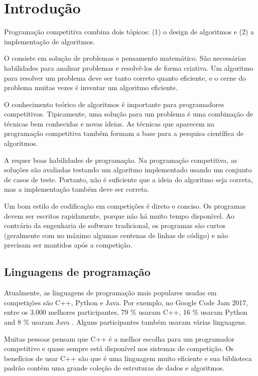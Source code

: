\chapter{Introdução}

Programação competitiva combina dois tópicos:
(1) o design de algoritmos e (2) a implementação de algoritmos.

O  consiste em solução de problemas
e pensamento matemático.
São necessárias habilidades para analisar problemas e resolvê-los de forma criativa.
Um algoritmo para resolver um problema deve ser tanto correto quanto eficiente, e o cerne do problema muitas vezes é inventar um algoritmo eficiente.

O conhecimento teórico de algoritmos é importante para programadores competitivos. Tipicamente, uma solução para um problema é uma combinação de técnicas bem conhecidas e novas ideias. As técnicas que aparecem na programação competitiva também formam a base para a pesquisa científica de algoritmos.

A  requer boas habilidades de programação. Na programação competitiva, as soluções são avaliadas testando um algoritmo implementado usando um conjunto de casos de teste. Portanto, não é suficiente que a ideia do algoritmo seja correta, mas a implementação também deve ser correta.

Um bom estilo de codificação em competições é direto e conciso. Os programas devem ser escritos rapidamente, porque não há muito tempo disponível. Ao contrário da engenharia de software tradicional, os programas são curtos (geralmente com no máximo algumas centenas de linhas de código) e não precisam ser mantidos após a competição.

\section{Linguagens de programação}


Atualmente, as linguagens de programação mais populares usadas em competições são C++, Python e Java. 
 Por exemplo, no Google Code Jam 2017, 
 entre os 3.000 melhores participantes,
79 \% usaram C++,
16 \% usaram Python and
8 \% usaram Java \cite{goo17}.
Alguns participantes também usaram várias linguagens.

Muitas pessoas pensam que C++ é a melhor escolha para um programador competitivo e quase sempre está disponível nos sistemas de competição. Os benefícios de usar C++ são que é uma linguagem muito eficiente e sua biblioteca padrão contém uma grande coleção de estruturas de dados e algoritmos.

